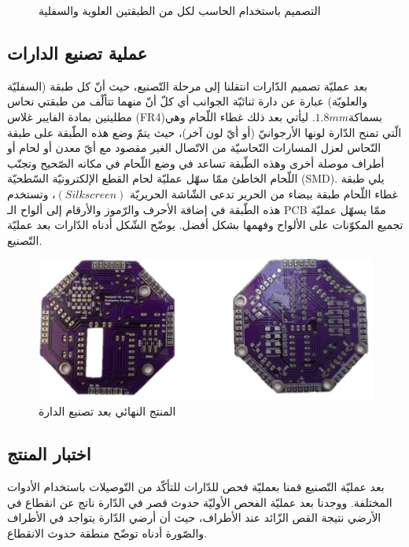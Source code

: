  \begin{figure}[htbp]
 	\centering
 	
 	\caption{التصميم باستخدام الحاسب لكل من الطبقتين العلوية والسفلية}
 	\label{15:fig:1}
 \end{figure}

\subsection{عملية تصنيع الدارات}

بعد عمليّة تصميم الدّارات انتقلنا إلى مرحلة التّصنيع، حيث أنّ كل طبقة (السفليّة والعلويّة) عبارة عن دارة ثنائيّة الجوانب أي كلّ أنّ منهما تتألّف من طبقتي نحاس مطليتين بمادة الفايبر غلاس (FR4)بسماكة$ 1.8 mm$.  ليأتي بعد ذلك غطاء اللّحام وهي الّتي تمنح الدّارة لونها الأرجوانيّ (أو أيّ لون آخر)، حيث يتمّ وضع هذه الطّبقة على طبقة النّحاس لعزل المسارات النّحاسيّة من الاتّصال الغير مقصود مع أيّ معدن أو لحام أو أطراف موصلة أخرى وهذه الطّبقة تساعد في وضع اللّحام في مكانه الصّحيح وتجنّب اللّحام الخاطئ ممّا سهّل عمليّة لحام القطع الإلكترونيّة السّطحيّة (SMD).  يلي طبقة غطاء اللّحام طبقة بيضاء من الحرير تدعى الشّاشة الحريريّة $ (Silk screen) $، وتستخدم هذه الطّبقة في إضافة الأحرف والرّموز والأرقام إلى ألواح الـ PCB ممّا يسهّل عمليّة تجميع المكوّنات على الألواح وفهمها بشكل أفضل.  يوضّح الشّكل أدناه الدّارات بعد عمليّة التّصنيع.

\begin{figure}[h]
	\centering
	\includegraphics[width=0.9\linewidth]{figs/15/fig15_2}
	\caption{المنتج النهائي بعد تصنيع الدارة}
	\label{15:fig:2}
\end{figure}

\subsection{اختبار المنتج}

بعد عمليّة التّصنيع قمنا بعمليّة فحص للدّارات للتأكّد من التّوصيلات باستخدام الأدوات المختلفة. ووجدنا بعد عمليّة الفحص الأوليّة حدوث قصر في الدّارة ناتج عن انقطاع في الأرضي نتيجة القص الزّائد عند الأطراف، حيث أن أرضي الدّارة يتواجد في الأطراف والصّورة أدناه توضّح منطقة حدوث الانقطاع.

